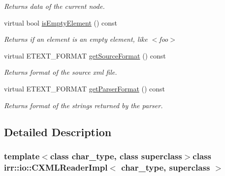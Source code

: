 \begin{DoxyCompactItemize}
\begin{DoxyCompactList}\small\item\em Returns data of the current node. \end{DoxyCompactList}\item 
\hypertarget{classirr_1_1io_1_1_c_x_m_l_reader_impl_a17154683d277084155fe6c5556cc0672}{virtual bool \hyperlink{classirr_1_1io_1_1_c_x_m_l_reader_impl_a17154683d277084155fe6c5556cc0672}{is\+Empty\+Element} () const }\label{classirr_1_1io_1_1_c_x_m_l_reader_impl_a17154683d277084155fe6c5556cc0672}

\begin{DoxyCompactList}\small\item\em Returns if an element is an empty element, like $<$foo$>$ \end{DoxyCompactList}\item 
\hypertarget{classirr_1_1io_1_1_c_x_m_l_reader_impl_a0947ce3e44eb7c324ff1bdb430dedfa8}{virtual E\+T\+E\+X\+T\+\_\+\+F\+O\+R\+M\+A\+T \hyperlink{classirr_1_1io_1_1_c_x_m_l_reader_impl_a0947ce3e44eb7c324ff1bdb430dedfa8}{get\+Source\+Format} () const }\label{classirr_1_1io_1_1_c_x_m_l_reader_impl_a0947ce3e44eb7c324ff1bdb430dedfa8}

\begin{DoxyCompactList}\small\item\em Returns format of the source xml file. \end{DoxyCompactList}\item 
\hypertarget{classirr_1_1io_1_1_c_x_m_l_reader_impl_adc53297eecc7760721a6bd4d3875c12b}{virtual E\+T\+E\+X\+T\+\_\+\+F\+O\+R\+M\+A\+T \hyperlink{classirr_1_1io_1_1_c_x_m_l_reader_impl_adc53297eecc7760721a6bd4d3875c12b}{get\+Parser\+Format} () const }\label{classirr_1_1io_1_1_c_x_m_l_reader_impl_adc53297eecc7760721a6bd4d3875c12b}

\begin{DoxyCompactList}\small\item\em Returns format of the strings returned by the parser. \end{DoxyCompactList}\end{DoxyCompactItemize}


\subsection{Detailed Description}
\subsubsection*{template$<$class char\+\_\+type, class superclass$>$class irr\+::io\+::\+C\+X\+M\+L\+Reader\+Impl$<$ char\+\_\+type, superclass $>$}

